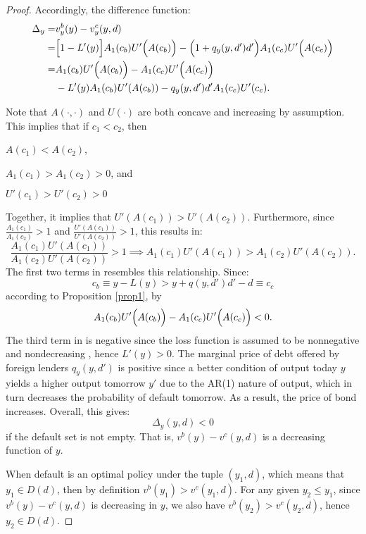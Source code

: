 \begin{proof}
    Accordingly, the difference function:
    \begin{align}
        \Delta_y =& v^b_y(y) - v^c_y(y, d) \nonumber \\
        =& \Big[ 1 - L' (y)\Big] A_1 (c_b) U' \Bigl(A(c_b)\Bigr)-
            \Big(1 + q_y(y, d')d'\Big) A_1(c_c) U'\Big(A(c_c)\Big) \nonumber\\
        =& A_1 (c_b) U' \Bigl(A(c_b)\Bigr)-A_1 (c_c) U' \Bigl(A(c_c)\Bigr)  \nonumber \\
        & -L'(y) A_1(c_b)U'(A(c_b)) - q_y(y, d')d'A_1(c_c)U'(c_c). \label{eq:diff-value-function}
    \end{align}

    Note that $A(\cdot, \cdot)$ and $U(\cdot)$ are both concave and increasing by assumption. This implies that if $c_1<c_2$, then
    \begin{enumerate*}[label = (\roman*)]
        \item $A(c_1) < A(c_2)$,
        \item $A_1(c_1) > A_1(c_2)>0$, and
        \item $U'(c_1) > U'(c_2)>0$
    \end{enumerate*}
    Together, it implies that $U'(A(c_1)) > U'(A(c_2))$. Furthermore, since $\frac{A_1(c_1)}{A_1(c_2)} > 1$ and $\frac {U'(A(c_1))}{U'(A(c_2))} > 1$, this results in:
    \begin{equation}
        \label{eq:AUA-compare}
        \frac{A_1(c_1) U'(A(c_1))}{A_1(c_2) U'(A(c_2))} > 1 \implies
        {A_1(c_1) U'(A(c_1))} > {A_1(c_2) U'(A(c_2))}.
    \end{equation}
    The first two terms in  resembles this relationship. Since:
    \begin{equation*}
        c_b \equiv y - L(y) > y+q(y, d')d' -d \equiv c_c
    \end{equation*}
    according to Proposition \ref{prop1}, by 
    \begin{equation*}
        A_1 (c_b) U' \Bigl(A(c_b)\Bigr) - A_1 (c_c) U' \Bigl(A(c_c)\Bigr) < 0.
    \end{equation*}
    The third term in  is negative since the loss function is assumed to be nonnegative and nondecreasing \citep{Na-18}, hence $L'(y) > 0$. The marginal price of debt offered by foreign lenders $q_y(y, d')$ is positive since a better condition of output today $y$ yields a higher output tomorrow $y'$ due to the AR(1) nature of output, which in turn decreases the probability of default tomorrow. As a result, the price of bond increases.
    Overall, this gives:
    \begin{equation*}
        \Delta_y (y, d) < 0
    \end{equation*}
    if the default set is not empty. That is, $v^b(y) - v^c(y, d)$ is a decreasing function of $y$.

    When default is an optimal policy under the tuple $(y_1, d)$, which means that $y_1 \in D(d)$, then by definition $v^b(y_1) > v^c(y_1, d)$. For any given $y_2 \le y_1$, since $v^b(y) - v^c(y, d)$ is decreasing in $y$, we also have $v^b(y_2) > v^c(y_2, d)$, hence $y_2 \in D(d)$.
\end{proof}

